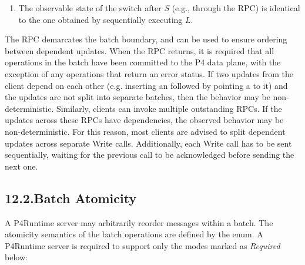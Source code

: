 \documentclass[11pt]{article}
\begin{document}
{\begin{enumerate}[noitemsep,topsep=\mdcompacttopsep]
\item{}The observable state of the switch after $S$ (e.g., through the  RPC)
is identical to the one obtained by sequentially executing $L$.%
\end{enumerate}%

\noindent{}The  RPC demarcates the batch boundary, and can be used to ensure
ordering between dependent updates. When the  RPC returns, it is required
that all operations in the batch have been committed to the P4 data plane,
with the exception of any operations that return an error status.
If two updates from the client depend on each other (e.g. inserting an
 followed by pointing a  to it) and the updates
are not split into separate batches, then the behavior may be non-deterministic.
Similarly, clients can invoke multiple outstanding  RPCs. If the updates
across these RPCs have dependencies, the observed behavior may be
non-deterministic. For this reason, most clients are advised to split dependent
updates across separate Write calls. Additionally, each Write call has to be
sent sequentially, waiting for the previous call to be acknowledged before
sending the next one.%

\subsection{12.2.\hspace*{0.5em}Batch Atomicity}\label{sec-batch-atomicity}%

\noindent{}A P4Runtime server may arbitrarily reorder messages within a batch. The
atomicity semantics of the batch operations are defined by the 
enum. A P4Runtime server is required to support only the modes marked as
\emph{Required} below:%

}
\end{document}
